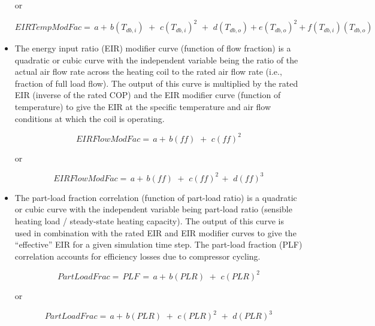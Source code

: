 \begin{itemize}
or

\begin{equation}
EIRTempModFac = \,a + \,b\left( {{T_{db,i}}} \right)\,\, + \,\,c{\left( {{T_{db,i}}} \right)^2}\,\, + \,\,d\left( {{T_{db,o}}} \right) + e{\left( {{T_{db,o}}} \right)^2} + f\left( {{T_{db,i}}} \right)\left( {{T_{db,o}}} \right)
\end{equation}

  \item
The energy input ratio (EIR) modifier curve (function of flow fraction) is a quadratic or cubic curve with the independent variable being the ratio of the actual air flow rate across the heating coil to the rated air flow rate (i.e., fraction of full load flow). The output of this curve is multiplied by the rated EIR (inverse of the rated COP) and the EIR modifier curve (function of temperature) to give the EIR at the specific temperature and air flow conditions at which the coil is operating.

\begin{equation}
EIRFlowModFac = \,a + \,b\left( {ff} \right)\,\, + \,\,c{\left( {ff} \right)^2}
\end{equation}

or

\begin{equation}
EIRFlowModFac = \,a + \,b\left( {ff} \right)\,\, + \,\,c{\left( {ff} \right)^2}\, + \,\,d{\left( {ff} \right)^3}
\end{equation}

  \item
The part-load fraction correlation (function of part-load ratio) is a quadratic or cubic curve with the independent variable being part-load ratio (sensible heating load / steady-state heating capacity). The output of this curve is used in combination with the rated EIR and EIR modifier curves to give the ``effective'' EIR for a given simulation time step. The part-load fraction (PLF) correlation accounts for efficiency losses due to compressor cycling.

\begin{equation}
PartLoadFrac = \,PLF\, = \,a + \,b\left( {PLR} \right)\,\, + \,\,c{\left( {PLR} \right)^2}
\end{equation}

or

\begin{equation}
PartLoadFrac = \,a + \,b\left( {PLR} \right)\,\, + \,\,c{\left( {PLR} \right)^2}\,\, + \,\,d{\left( {PLR} \right)^3}
\end{equation}


\end{itemize}
